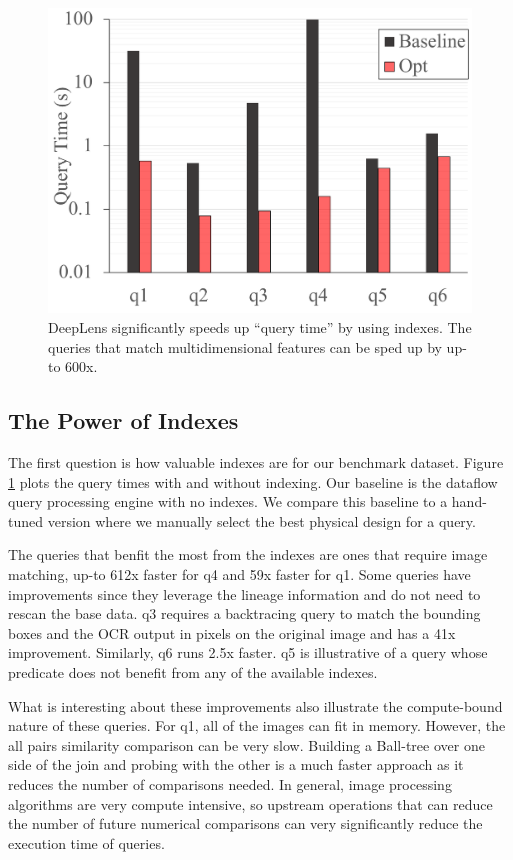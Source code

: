 \begin{figure}[t]
\centering
 \includegraphics[width=0.7\columnwidth]{figures/query.png}
 \caption{\textsf{DeepLens} significantly speeds up ``query time'' by using indexes. The queries that match multidimensional features can be sped up by up-to 600x.  \label{query} }
\end{figure}

\subsection{The Power of Indexes}
The first question is how valuable indexes are for our benchmark dataset.
Figure \ref{query} plots the query times with and without indexing.
Our baseline is the dataflow query processing engine with no indexes.
We compare this baseline to a hand-tuned version where we manually select the best physical design for a query.

The queries that benfit the most from the indexes are ones that require image matching, up-to 612x faster for q4 and 59x faster for q1. Some queries have improvements since they leverage the lineage information and do not need to rescan the base data. q3 requires a backtracing query to match the bounding boxes and the OCR output in pixels on the original image and has a 41x improvement. Similarly, q6 runs 2.5x faster. q5 is illustrative of a query whose predicate does not benefit from any of the available indexes.

What is interesting about these improvements also illustrate the compute-bound nature of these queries.
For q1, all of the images can fit in memory.
However, the all pairs similarity comparison can be very slow.
Building a Ball-tree over one side of the join and probing with the other is a much faster approach as it reduces the number of comparisons needed.
In general, image processing algorithms are very compute intensive, so upstream operations that can reduce the number of future numerical comparisons can very significantly reduce the execution time of queries.


